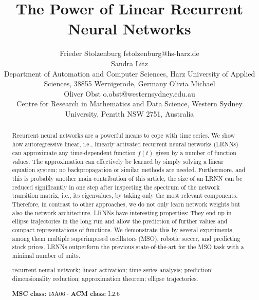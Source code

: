 \documentclass[twoside,11pt]{article}
\theoremstyle{definition}
\begin{document}
\title{The Power of Linear Recurrent Neural Networks}
\author{\name Frieder Stolzenburg \email fstolzenburg@hs-harz.de\\ %
	\name Sandra Litz\\ %
	\addr Department of Automation and Computer Sciences,
	Harz University of Applied Sciences,
	38855 Wernigerode, Germany
\AND	
	\name Olivia Michael\\ %
	\name Oliver Obst \email o.obst@westernsydney.edu.au\\ %
	\addr Centre for Research in Mathematics and Data Science,
	Western Sydney University,
	Penrith NSW 2751, Australia}
\editor{}
\maketitle

\begin{abstract}
Recurrent neural networks are a powerful means to cope with time series. We show
how autoregressive linear, i.e., linearly activated recurrent neural networks (LRNNs) can
approximate any time-dependent function $f(t)$ given by a number of function
values. The approximation can effectively be learned by simply solving a linear
equation system; no backpropagation or similar methods are needed. Furthermore,
and this is probably another main contribution of this article, the size of an
LRNN can be reduced significantly in one step after inspecting the spectrum
of the network transition matrix, i.e., its eigenvalues, by taking only the most
relevant components. Therefore, in contrast to other approaches, we do not only
learn network weights but also the network architecture. LRNNs have interesting
properties: They end up in ellipse trajectories in the long run and allow the
prediction of further values and compact representations of functions. We
demonstrate this by several experiments, among them multiple superimposed
oscillators (MSO), robotic soccer, and predicting stock prices. LRNNs outperform
the previous state-of-the-art for the MSO task with a minimal number of units.

\smallskip
\begin{keywords}
recurrent neural network; linear activation; time-series analysis; prediction;
dimensionality reduction; approximation theorem; ellipse trajectories.
\end{keywords}

\smallskip
\noindent\textbf{MSC class:} 15A06 \;$\cdot$\; \textbf{ACM class:} I.2.6%
\end{abstract}
\end{document}
